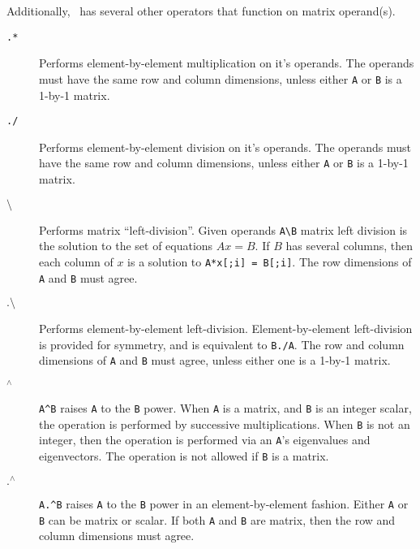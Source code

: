    Additionally, \RLaB\ has several other operators that function on
   matrix operand(s). 

   \begin{description}
     \item[\verb+.*+] Performs element-by-element multiplication on
              it's operands. The operands must have the same row and
              column dimensions, unless either \verb+A+ or \verb+B+ is
              a 1-by-1 matrix.

     \item[\verb+./+] Performs element-by-element division on it's
              operands. The operands must have the same row and column
              dimensions, unless either \verb+A+ or \verb+B+ is a
              1-by-1 matrix.

     \item[$\setminus$] Performs matrix ``left-division''. Given
              operands {\verb+A\B+} matrix left division is the
              solution to the set of equations $Ax = B$. If $B$ has
              several columns, then each column of $x$ is a solution
              to {\verb+A*x[;i] = B[;i]+}. The row dimensions of
              \verb+A+ and \verb+B+ must agree.

     \item[$.\setminus$] Performs element-by-element left-division.
              Element-by-element left-division is provided for
              symmetry, and is equivalent to \verb+B./A+. The row and
              column dimensions of \verb+A+ and \verb+B+ must agree,
              unless either one is a 1-by-1 matrix.

     \item[${}^\wedge{}$] {\verb+A^B+} raises \verb+A+ to the \verb+B+
              power. When \verb+A+ is a matrix, and \verb+B+ is an
              integer scalar, the operation is performed by successive
              multiplications. When \verb+B+ is not an integer, then
              the operation is performed via an \verb+A+'s eigenvalues
              and eigenvectors. The operation is not allowed if
              \verb+B+ is a matrix.

     \item[${.}^\wedge{}$] {\verb+A.^B+} raises \verb+A+ to the
              \verb+B+ power in an element-by-element fashion. Either
              \verb+A+ or \verb+B+ can be matrix or scalar. If both
              \verb+A+ and \verb+B+ are matrix, then the row and
              column dimensions must agree.


\end{description}
